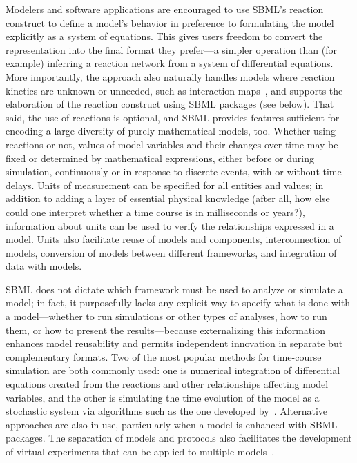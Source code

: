 \documentclass{sbml-paper}
\begin{document}
Modelers and software applications are encouraged to use SBML's reaction construct to define a model's behavior in preference to formulating the model explicitly as a system of equations.  This gives users freedom to convert the representation into the final format they prefer---a simpler operation than (for example) inferring a reaction network from a system of differential equations.  More importantly, the approach also naturally handles models where reaction kinetics are unknown or unneeded, such as interaction maps~\citep[e.g.,][]{thiele2013community}, and supports the elaboration of the reaction construct using SBML packages (see below).  That said, the use of reactions is optional, and SBML provides features sufficient for encoding a large diversity of purely mathematical models, too.  Whether using reactions or not, values of model variables and their changes over time may be fixed or determined by mathematical expressions, either before or during simulation, continuously or in response to discrete events, with or without time delays.  Units of measurement can be specified for all entities and values; in addition to adding a layer of essential physical knowledge (after all, how else could one interpret whether a time course is in milliseconds or years?), information about units can be used to verify the relationships expressed in a model.  Units also facilitate reuse of models and components, interconnection of models, conversion of models between different frameworks, and integration of data with models.

SBML does not dictate which framework must be used to analyze or simulate a model; in fact, it purposefully lacks any explicit way to specify what is done with a model---whether to run simulations or other types of analyses, how to run them, or how to present the results---because externalizing this information enhances model reusability and permits independent innovation in separate but complementary formats.  Two of the most popular methods for time-course simulation are both commonly used: one is numerical integration of differential equations created from the reactions and other relationships affecting model variables, and the other is simulating the time evolution of the model as a stochastic system via algorithms such as the one developed by~\cite{gillespie1977exact}.  Alternative approaches are also in use, particularly when a model is enhanced with SBML packages.  The separation of models and protocols also facilitates the development of virtual experiments that can be applied to multiple models~\citep{Cooper2015call}.
\end{document}
